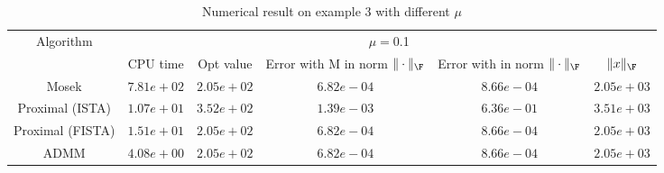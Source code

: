 \begin{table}
\centering
\begin{tabular}{|c|c|c|c|c|c|}

\hline
\multirow{2}{*}{ Algorithm} &\multicolumn{5}{c|}{$\mu=$0.1}\\\cline{2-6}
 &CPU time &Opt value &Error with M in norm $\|\cdot\|_\F$ &Error with in norm $\|\cdot\|_\F$ &$\|x\|_\F$\\\hline
Mosek & $7.81e+02$ & $2.05e+02$ & $6.82e-04$ & $8.66e-04$ & $2.05e+03$\\\hline
Proximal (ISTA) & $1.07e+01$ & $3.52e+02$ & $1.39e-03$ & $6.36e-01$ & $3.51e+03$\\\hline
Proximal (FISTA) & $1.51e+01$ & $2.05e+02$ & $6.82e-04$ & $8.66e-04$ & $2.05e+03$\\\hline
ADMM & $4.08e+00$ & $2.05e+02$ & $6.82e-04$ & $8.66e-04$ & $2.05e+03$\\\hline
\end{tabular}
\caption{Numerical result on example 3 with different $\mu$\label{example3}}
\end{table}
